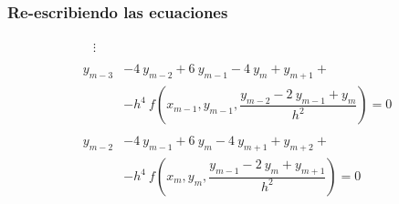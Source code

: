\begin{frame}
\frametitle{Re-escribiendo las ecuaciones}
\fontsize{12}{12}\selectfont
\begin{align}
\begin{aligned}
&{} \vdots  \nonumber
\end{aligned} \\
\begin{aligned}
y_{m-3} &- 4 \: y_{m-2} + 6 \: y_{m-1} - 4 \: y_{m} + y_{m+1} + \\
&- h^{4} \: f \left( x_{m-1}, y_{m-1}, \dfrac{y_{m-2} - 2 \: y_{m-1} + y_{m}}{h^{2}} \right) = 0 \label{eq:ecuacion_08_13d}
\end{aligned} \\
\begin{aligned}
y_{m-2} &- 4 \: y_{m-1} + 6 \: y_{m} - 4 \: y_{m+1} + y_{m+2} + \\
&- h^{4} \: f \left( x_{m}, y_{m}, \dfrac{y_{m-1} - 2 \: y_{m} + y_{m+1}}{h^{2}} \right) = 0 \label{eq:ecuacion_08_13e}
\end{aligned}
\end{align}
\end{frame}
